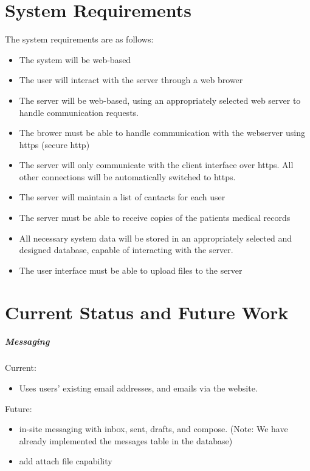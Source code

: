 \documentclass[12pt]{report}
\begin{document}
\chapter{System Requirements}
The system requirements are as follows:
\begin{itemize}
\item The system will be web-based
\item The user will interact with the server through a web brower
\item The server will be web-based, using an appropriately selected web server to handle communication requests.
\item The brower must be able to handle communication with the webserver using https (secure http)
\item The server will only communicate with the client interface over https.  All other connections will be automatically switched to https.
\item The server will maintain a list of cantacts for each user
\item The server must be able to receive copies of the patients medical records
\item All necessary system data will be stored in an appropriately selected and designed database, capable of interacting with the server.
\item The user interface must be able to upload files to the server
\end{itemize}

\chapter{Current Status and Future Work}

\paragraph{Messaging}
Current: 
\begin{itemize}
\item Uses users' existing email addresses, and emails via the website. 
\end{itemize}
Future: 
\begin{itemize}
\item in-site messaging with inbox, sent, drafts, and compose. (Note: We have already implemented the messages table in the database)
\item add attach file capability
\end{itemize}
\end{document}
